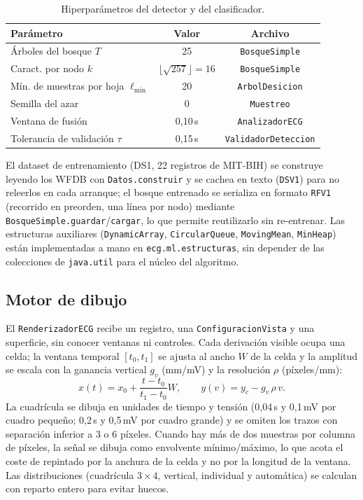 \begin{table}[t]
\centering
\footnotesize
\setlength{\tabcolsep}{3pt}
\begin{tabular}{@{}lcc@{}}
\toprule
Parámetro & Valor & Archivo \\
\midrule
Árboles del bosque $T$ & 25 & \texttt{Bosque\-Simple} \\
Caract. por nodo $k$ & $\lfloor\sqrt{257}\rfloor{=}16$ & \texttt{Bosque\-Simple} \\
Mín. de muestras por hoja $\ell_{\min}$ & 20 & \texttt{Arbol\-Desicion} \\
Semilla del azar & 0 & \texttt{Muestreo} \\
Ventana de fusión & 0,10\,s & \texttt{Analizador\-ECG} \\
Tolerancia de validación $\tau$ & 0,15\,s & \texttt{Validador\-Deteccion} \\
\bottomrule
\end{tabular}
\caption{Hiperparámetros del detector y del clasificador.}
\label{tab:parametros}
\end{table}

El dataset de entrenamiento (DS1, 22 registros de MIT-BIH) se construye leyendo los WFDB con \texttt{Datos.construir} y se cachea en texto (\texttt{DSV1}) para no releerlos en cada arranque; el bosque entrenado se serializa en formato \texttt{RFV1} (recorrido en preorden, una línea por nodo) mediante \texttt{BosqueSimple.guardar}/\texttt{cargar}, lo que permite reutilizarlo sin re-entrenar. Las estructuras auxiliares (\texttt{DynamicArray}, \texttt{CircularQueue}, \texttt{MovingMean}, \texttt{MinHeap}) están implementadas a mano en \texttt{ecg.ml.estructuras}, sin depender de las colecciones de \texttt{java.util} para el núcleo del algoritmo.



\subsection{Motor de dibujo}
El \texttt{RenderizadorECG} recibe un registro, una \texttt{ConfiguracionVista} y una superficie, sin conocer ventanas ni controles. Cada derivación visible ocupa una celda; la ventana temporal $[t_0,t_1]$ se ajusta al ancho $W$ de la celda y la amplitud se escala con la ganancia vertical $g_v$ (mm/mV) y la resolución $\rho$ (píxeles/mm):
\begin{equation}
x(t)=x_0+\frac{t-t_0}{t_1-t_0}W,\qquad
y(v)=y_c-g_v\,\rho\,v .
\end{equation}
La cuadrícula se dibuja en unidades de tiempo y tensión (0,04\,s y 0,1\,mV por cuadro pequeño; 0,2\,s y 0,5\,mV por cuadro grande) y se omiten los trazos con separación inferior a 3 o 6 píxeles. Cuando hay más de dos muestras por columna de píxeles, la señal se dibuja como envolvente mínimo/máximo, lo que acota el coste de repintado por la anchura de la celda y no por la longitud de la ventana. Las distribuciones (cuadrícula $3\times4$, vertical, individual y automática) se calculan con reparto entero para evitar huecos.

